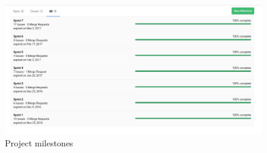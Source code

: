 \begin{figure}
\begin{center}
\includegraphics[width=15cm]{figures/milestones}
\end{center}
\caption{Project milestones}
\label{fig:project_milestones}
\end{figure}
